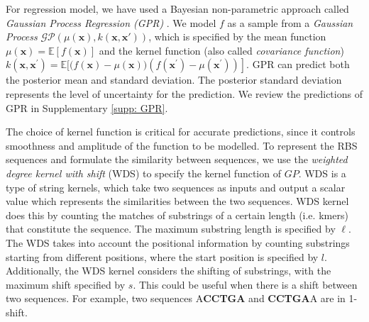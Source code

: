 For regression model, we have used a Bayesian non-parametric approach called \textit{Gaussian Process Regression (GPR)} \cite{Rasmussen2004}.
We model $f$ as a sample from a \textit{Gaussian Process} $\mathcal{G} \mathcal{P}(\mu(\mathbf{x}), k(\mathbf{x}, \mathbf{x'}))$, which is specified by the mean function $\mu(\mathbf{x})=\mathbb{E}[f(\mathbf{x})]$ and the kernel function (also called \textit{covariance function}) $k\left(\mathbf{x}, \mathbf{x}^{\prime}\right)=\mathbb{E}[(f(\mathbf{x})-\left.\mu(\mathbf{x}))\left(f\left(\mathbf{x}^{\prime}\right)-\mu\left(\mathbf{x}^{\prime}\right)\right)\right]$.
GPR can predict both the posterior mean and standard deviation. The posterior standard deviation represents the level of uncertainty for the prediction. 
We review the predictions of GPR in Supplementary \ref{supp: GPR}.


The choice of kernel function is critical for accurate predictions, since it controls smoothness and amplitude of the function to be modelled.
To represent the RBS sequences and formulate the similarity between sequences, we use the \textit{weighted degree kernel with shift} (WDS) \cite{ratsch_rase_2005_wds} to specify the kernel function of $GP$.  
WDS is a type of string kernels, which take two sequences as inputs and output a scalar value which represents the similarities between the two sequences.  
WDS kernel does this by counting the matches of substrings of a certain length (i.e. kmers) that constitute the sequence.
The maximum substring length is specified by $\ell$. 
The WDS takes into account the positional information by counting substrings starting from different positions, where the start position is specified by $l$.
Additionally, the WDS kernel considers the shifting of substrings, with the maximum shift specified by $s$.
This could be useful when there is a shift between two sequences.
For example, two sequences A\textbf{CCTGA} and \textbf{CCTGA}A are in 1-shift. 


